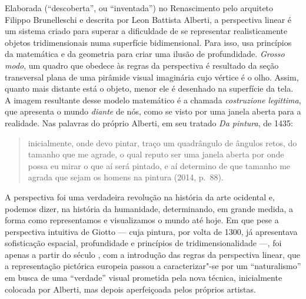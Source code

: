 Elaborada (``descoberta'', ou ``inventada'') no Renascimento pelo
arquiteto Filippo Brunelleschi e descrita por Leon Battista Alberti, a
perspectiva linear é um sistema criado para superar a dificuldade de se
representar realisticamente objetos tridimensionais numa superfície
bidimensional. Para isso, usa princípios da matemática e da geometria
para criar uma ilusão de profundidade. \emph{Grosso modo}, um quadro que
obedece às regras da perspectiva é resultado da seção transversal plana
de uma pirâmide visual imaginária cujo vértice é o olho. Assim, quanto
mais distante está o objeto, menor ele é desenhado na superfície da
tela. A imagem resultante desse modelo matemático é a chamada
\emph{costruzione legittima}, que apresenta o mundo \emph{diante} de
nós, como se visto por uma janela aberta para a realidade. Nas palavras
do próprio Alberti, em seu tratado \emph{Da pintura}, de 1435:

\begin{quote}
inicialmente, onde devo pintar, traço um quadrângulo de ângulos retos,
do tamanho que me agrade, o qual reputo ser uma janela aberta por onde
possa eu mirar o que aí será pintado, e aí determino de que tamanho me
agrada que sejam os homens na pintura (2014, p.~88).
\end{quote}

A perspectiva foi uma verdadeira revolução na história da arte ocidental
e, podemos dizer, na história da humanidade, determinando, em grande
medida, a forma como representamos e visualizamos o mundo até hoje. Em
que pese a perspectiva intuitiva de Giotto --- cuja pintura, por volta de
1300, já apresentava sofisticação espacial, profundidade e princípios de
tridimensionalidade ---, foi apenas a partir do século , com a
introdução das regras da perspectiva linear, que a representação
pictórica europeia passou a caracterizar"-se por um ``naturalismo'' em
busca de uma ``verdade'' visual prometida pela nova técnica,
inicialmente colocada por Alberti, mas depois aperfeiçoada pelos
próprios artistas.

